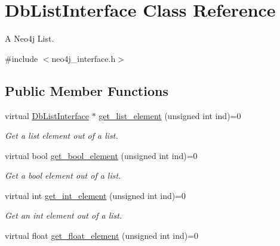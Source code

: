 \hypertarget{classDbListInterface}{\section{Db\-List\-Interface Class Reference}
\label{classDbListInterface}
}


A Neo4j List.  




{\ttfamily \#include $<$neo4j\-\_\-interface.\-h$>$}

\subsection*{Public Member Functions}
\begin{DoxyCompactItemize}
\item 
\hypertarget{classDbListInterface_af08cd8eb6763d9963e8ba359d0139fab}{virtual \hyperlink{classDbListInterface}{Db\-List\-Interface} $\ast$ \hyperlink{classDbListInterface_af08cd8eb6763d9963e8ba359d0139fab}{get\-\_\-list\-\_\-element} (unsigned int ind)=0}\label{classDbListInterface_af08cd8eb6763d9963e8ba359d0139fab}

\begin{DoxyCompactList}\small\item\em Get a list element out of a list. \end{DoxyCompactList}\item 
\hypertarget{classDbListInterface_aed51c97a5b72e67402d750bf8540b7b4}{virtual bool \hyperlink{classDbListInterface_aed51c97a5b72e67402d750bf8540b7b4}{get\-\_\-bool\-\_\-element} (unsigned int ind)=0}\label{classDbListInterface_aed51c97a5b72e67402d750bf8540b7b4}

\begin{DoxyCompactList}\small\item\em Get a bool element out of a list. \end{DoxyCompactList}\item 
\hypertarget{classDbListInterface_a21aa8acc708256af0e5b81f264961ab5}{virtual int \hyperlink{classDbListInterface_a21aa8acc708256af0e5b81f264961ab5}{get\-\_\-int\-\_\-element} (unsigned int ind)=0}\label{classDbListInterface_a21aa8acc708256af0e5b81f264961ab5}

\begin{DoxyCompactList}\small\item\em Get an int element out of a list. \end{DoxyCompactList}\item 
\hypertarget{classDbListInterface_aa14ef83f3dd278197d0b36a2c41fb097}{virtual float \hyperlink{classDbListInterface_aa14ef83f3dd278197d0b36a2c41fb097}{get\-\_\-float\-\_\-element} (unsigned int ind)=0}\label{classDbListInterface_aa14ef83f3dd278197d0b36a2c41fb097}


\end{DoxyCompactItemize}
